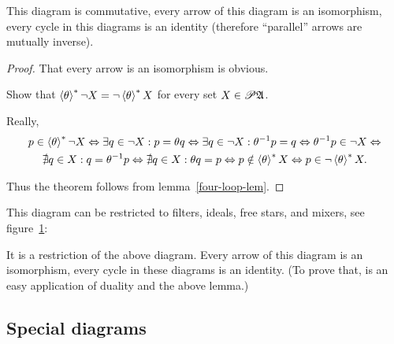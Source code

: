 \begin{thm}
This diagram is commutative, every arrow of this diagram is an isomorphism,
every cycle in this diagrams is an identity (therefore ``parallel''
arrows are mutually inverse).\end{thm}
\begin{proof}
That every arrow is an isomorphism is obvious.

Show that $\left\langle \theta\right\rangle ^{\ast}\lnot X=\lnot\left\langle \theta\right\rangle ^{\ast}X$ for every
set $X\in\mathscr{P}\mathfrak{A}$.

Really, 
\begin{multline*}
p\in\left\langle \theta\right\rangle ^{\ast}\lnot X\Leftrightarrow\exists q\in\lnot X:p=\theta q\Leftrightarrow\exists q\in\lnot X:\theta^{-1}p=q\Leftrightarrow\theta^{-1}p\in\lnot X\Leftrightarrow\\
\nexists q\in X:q=\theta^{-1}p\Leftrightarrow\nexists q\in X:\theta q=p\Leftrightarrow p\notin\left\langle \theta\right\rangle ^{\ast}X\Leftrightarrow p\in\lnot\left\langle \theta\right\rangle ^{\ast}X.
\end{multline*}


Thus the theorem follows from lemma~\ref{four-loop-lem}.
\end{proof}
This diagram can be restricted to filters, ideals, free stars, and
mixers, see figure~\ref{theta-flt}:

\begin{figure}[ht]
\caption{\label{theta-flt}}


\end{figure}

\begin{thm}
It is a restriction of the above diagram. Every arrow of this diagram
is an isomorphism, every cycle in these diagrams is an identity. (To
prove that, is an easy application of duality and the above lemma.)
\end{thm}

\subsection{Special diagrams}

